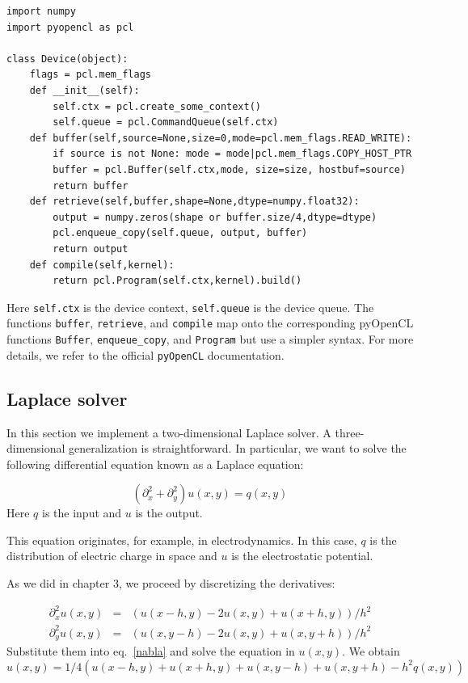 \documentclass[justified,sixbynine]{tufte-book}
\def\ft{\small\tt}
\theoremstyle{plain}%
\theoremstyle{definition}
\theoremstyle{remark}
\begin{document}
\begin{fullwidth}
\begin{lstlisting}
import numpy
import pyopencl as pcl

class Device(object):
    flags = pcl.mem_flags
    def __init__(self):
        self.ctx = pcl.create_some_context()
        self.queue = pcl.CommandQueue(self.ctx)
    def buffer(self,source=None,size=0,mode=pcl.mem_flags.READ_WRITE):
        if source is not None: mode = mode|pcl.mem_flags.COPY_HOST_PTR
        buffer = pcl.Buffer(self.ctx,mode, size=size, hostbuf=source)
        return buffer
    def retrieve(self,buffer,shape=None,dtype=numpy.float32):
        output = numpy.zeros(shape or buffer.size/4,dtype=dtype)
        pcl.enqueue_copy(self.queue, output, buffer)
        return output
    def compile(self,kernel):
        return pcl.Program(self.ctx,kernel).build()
\end{lstlisting}

Here {\ft self.ctx} is the device context, {\ft self.queue} is the device queue. The functions {\ft buffer}, {\ft retrieve}, and {\ft compile} map onto the corresponding pyOpenCL functions {\ft Buffer}, {\ft enqueue\_copy}, and {\ft Program} but use a simpler syntax. For more details, we refer to the official {\ft pyOpenCL} documentation.

\subsection{Laplace solver}

In this section we implement a two-dimensional Laplace solver. A three-dimensional generalization is straightforward. In particular, we want to solve the following differential equation known as a Laplace equation:

\begin{equation}
(\partial_x^2 + \partial_y^2) u(x,y) = q(x,y)
\label{nabla}
\end{equation}
Here $q$ is the input and $u$ is the output.

This equation originates, for example, in electrodynamics. In this case, $q$ is the distribution of electric charge in space and $u$ is the electrostatic potential.

As we did in chapter 3, we proceed by discretizing the derivatives:

\begin{eqnarray}
\partial_x^2 u(x,y) &=& (u(x-h,y)-2 u(x,y)+u(x+h,y))/h^2 \\
\partial_y^2 u(x,y) &=& (u(x,y-h)-2 u(x,y)+u(x,y+h))/h^2
\end{eqnarray}
Substitute them into eq.~\ref{nabla} and solve the equation in $u(x,y)$. We obtain
\begin{equation}
u(x,y) = 1/4 (u(x-h,y)+u(x+h,y)+u(x,y-h)+u(x,y+h)-h^2 q(x,y))
\label{nabla2}
\end{equation}


\end{fullwidth}
\end{document}
